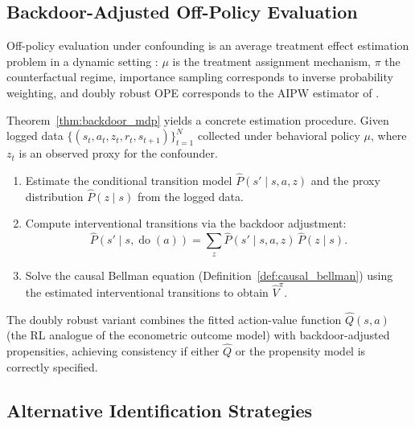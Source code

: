 \subsection{Backdoor-Adjusted Off-Policy Evaluation}
\label{subsec:backdoor_ope}

Off-policy evaluation under confounding is an average treatment effect estimation problem in a dynamic setting \citep{bannon2020causality}: $\mu$ is the treatment assignment mechanism, $\pi$ the counterfactual regime, importance sampling corresponds to inverse probability weighting, and doubly robust OPE corresponds to the AIPW estimator of \citet{robins1994estimation}.

Theorem~\ref{thm:backdoor_mdp} yields a concrete estimation procedure. Given logged data $\{(s_t, a_t, z_t, r_t, s_{t+1})\}_{t=1}^N$ collected under behavioral policy $\mu$, where $z_t$ is an observed proxy for the confounder.
\begin{enumerate}
\item Estimate the conditional transition model $\hat{P}(s' \mid s, a, z)$ and the proxy distribution $\hat{P}(z \mid s)$ from the logged data.
\item Compute interventional transitions via the backdoor adjustment:
\begin{equation}
\hat{P}(s' \mid s, \operatorname{do}(a)) = \sum_{z} \hat{P}(s' \mid s, a, z) \, \hat{P}(z \mid s).
\label{eq:backdoor_estimator}
\end{equation}
\item Solve the causal Bellman equation (Definition~\ref{def:causal_bellman}) using the estimated interventional transitions to obtain $\hat{V}^\pi$.
\end{enumerate}
The doubly robust variant combines the fitted action-value function $\hat{Q}(s,a)$ (the RL analogue of the econometric outcome model) with backdoor-adjusted propensities, achieving consistency if either $\hat{Q}$ or the propensity model is correctly specified.

\subsection{Alternative Identification Strategies}
\label{subsec:alternative_identification}

